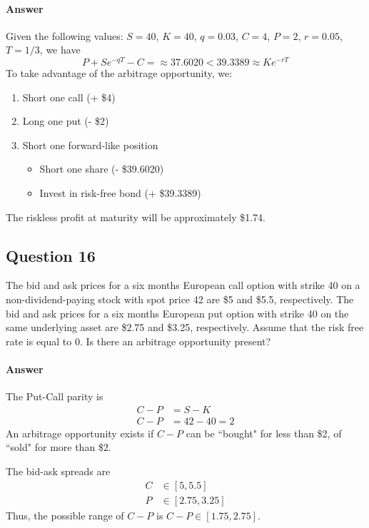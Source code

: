 \paragraph{Answer}
Given the following values: $ S = 40 $, $ K = 40 $, $ q = 0.03 $, $ C = 4 $,
    $ P = 2 $, $ r = 0.05 $, $ T = 1 / 3 $, we have
\begin{equation*}
    P + S e^{-qT} - C = \approx 37.6020 < 39.3389 \approx K e^{-rT}
\end{equation*}
To take advantage of the arbitrage opportunity, we:
\begin{enumerate}
    \item Short one call (+ \$4)
    \item Long one put (- \$2)
    \item Short one forward-like position
        \begin{itemize}
            \item Short one share (- \$39.6020)
            \item Invest in risk-free bond (+ \$39.3389)
        \end{itemize}
\end{enumerate}
The riskless profit at maturity will be approximately \$1.74.

\subsection{Question 16}
The bid and ask prices for a six months European call option with strike 40 on
    a non-dividend-paying stock with spot price 42 are \$5 and \$5.5,
    respectively.
The bid and ask prices for a six months European put option with strike 40 on
    the same underlying asset are \$2.75 and \$3.25, respectively.
Assume that the risk free rate is equal to 0.
Is there an arbitrage opportunity present?

\paragraph{Answer}
The Put-Call parity is
\begin{align*}
    C - P &= S - K \\
    C - P &= 42 - 40 = 2
\end{align*}
An arbitrage opportunity exists if $ C - P $ can be ``bought" for less than \$2,
    of ``sold" for more than \$2.

The bid-ask spreads are
\begin{align*}
    C &\in [5, 5.5] \\
    P &\in [2.75, 3.25]
\end{align*}
Thus, the possible range of $ C - P $ is $ C - P \in [1.75, 2.75] $.

